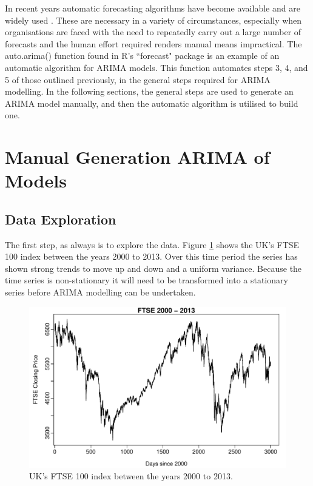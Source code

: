 In recent years automatic forecasting algorithms have become available and are widely used \citep{Hyndman08automatictime}. These are necessary in a variety of circumstances, especially when organisations are faced with the need to repeatedly carry out a large number of forecasts and the human effort required renders manual means impractical. The auto.arima() function found in R's \textquotedblleft forecast" package is an example of an automatic algorithm for ARIMA models. This function automates steps 3, 4, and 5 of those outlined previously, in the general steps required for ARIMA modelling. In the following sections, the general steps are used to generate an ARIMA model manually, and then the automatic algorithm is utilised to build one.

\section{Manual Generation ARIMA of Models}
\label{sec:man_arima}
\subsection{Data Exploration}

The first step, as always is to explore the data. Figure \ref{fig:chp_ts_ftse_2000_13} shows the UK's FTSE 100 index between the years 2000 to 2013. Over this time period the series has shown strong trends to move up and down and a uniform variance. Because the time series is non-stationary it will need to be transformed into a stationary series before ARIMA modelling can be undertaken.

\begin{figure}[tbh]
\centering
\includegraphics{Figures/chp_ts_ftse_2000-13}
\caption[FTSE 2000-13.]{UK's FTSE 100 index between the years 2000 to 2013.}
\label{fig:chp_ts_ftse_2000_13}
\end{figure}

